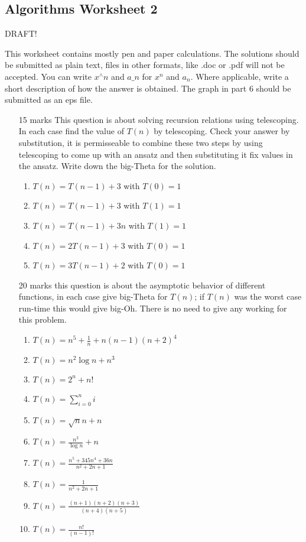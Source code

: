 \documentclass[11pt,a4paper]{scrartcl}
\begin{document}
\subsection*{Algorithms Worksheet 2}

DRAFT!

This worksheet contains mostly pen and paper calculations. The
solutions should be submitted as plain text, files in other formats,
like .doc or .pdf will not be accepted. You can write $x^\wedge n$ and
$a\_n$ for $x^n$ and $a_n$. Where applicable, write a short
description of how the answer is obtained. The graph in part 6 should
be submitted as an eps file.

\begin{enumerate}

\item [15 marks] This question is about solving recursion relations using
  telescoping. In each case find the value of $T(n)$ by
  telescoping. Check your answer by substitution, it is permisseable
  to combine these two steps by using telescoping to come up with an
  ansatz and then substituting it fix values in the ansatz. Write down
  the big-Theta for the solution.

\begin{enumerate}
\item $T(n)=T(n-1)+3$ with $T(0)=1$
\item $T(n)=T(n-1)+3$ with $T(1)=1$
\item $T(n)=T(n-1)+3n$ with $T(1)=1$
\item $T(n)=2T(n-1)+3$ with $T(0)=1$
\item $T(n)=3T(n-1)+2$ with $T(0)=1$
\end{enumerate}

\item [20 marks] this question is about the asymptotic behavior of different functions, in each case give big-Theta for $T(n)$; if $T(n)$ was the worst case run-time this would give big-Oh. There is no need to give any working for this problem.

\begin{enumerate}

\item $T(n)=n^5+\frac{1}{n}+n(n-1)(n+2)^4$
\item $T(n)=n^2\log{n}+n^3$
\item $T(n)=2^n+n!$
\item $T(n)=\sum_{i=0}^ni$
\item $T(n)=\sqrt{n}n+n$
\item $T(n)=\frac{n^2}{\log{n}}+n$
\item $T(n)=\frac{n^5+345n^4+36n}{n^2+2n+1}$
\item $T(n)=\frac{1}{n^2+2n+1}$
\item $T(n)=\frac{(n+1)(n+2)(n+3)}{(n+4)(n+5)}$
\item $T(n)=\frac{n!}{(n-1)!}$


\end{enumerate}
\end{enumerate}
\end{document}

